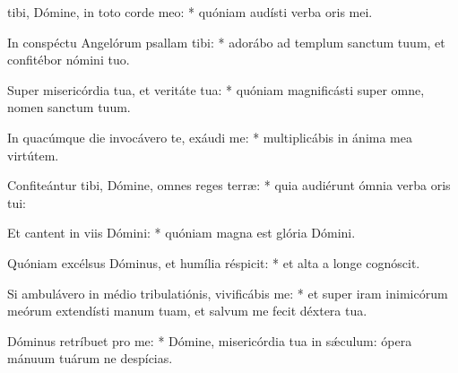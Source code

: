 \begin{psalmus}

 tibi, Dómine, in toto corde meo: * quóniam audísti verba oris mei.

In conspéctu Angelórum psallam tibi: * adorábo ad templum sanctum tuum, et confitébor nómini tuo.

Super misericórdia tua, et veritáte tua: * quóniam magnificásti super omne, nomen sanctum tuum.

In quacúmque die invocávero te, exáudi me: * multiplicábis in ánima mea virtútem.

Confiteántur tibi, Dómine, omnes reges terræ: * quia audiérunt ómnia verba oris tui:

Et cantent in viis Dómini: * quóniam magna est glória Dómini.

Quóniam excélsus Dóminus, et humília réspicit: * et alta a longe cognóscit.

Si ambulávero in médio tribulatiónis, vivificábis me: * et super iram inimicórum meórum extendísti manum tuam, et salvum me fecit déxtera tua.

Dóminus retríbuet pro me: * Dómine, misericórdia tua in sǽculum: ópera mánuum tuárum ne despícias.

\end{psalmus}

